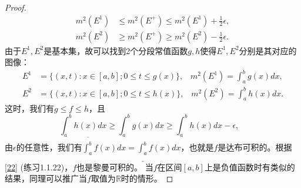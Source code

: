 \documentclass[reqno,a4paper,14pt]{amsart}
\begin{document}
\begin{proof}
    \begin{equation*}
        \begin{split}
            m^2(E^1)&\leq m^2(E^+)\leq m^2(E^1)+\frac{1}{2}\epsilon,\\
            m^2(E^2)&\geq m^2(E^+)\geq m^2(E^2)-\frac{1}{2}\epsilon.
        \end{split}
    \end{equation*}
    由于$E^1,E^2$是基本集，故可以找到2个分段常值函数$g,h$使得$E^1,E^2$分别是其对应的图像：
    \begin{equation*}
        \begin{split}
            E^1&=\{(x,t):x\in[a,b];0\leq t\leq g(x)\},\;\;\; m^2(E^1)=\int_a^b g(x)dx,\\
            E^2&=\{(x,t):x\in[a,b];0\leq t\leq h(x)\},\;\;\; m^2(E^2)=\int_a^b h(x)dx.
        \end{split}
    \end{equation*}
    这时，我们有$g\leq f\leq h$，且
    \begin{equation*}
        \int_a^b h(x)dx\geq \int_a^b g(x)dx \geq \int_a^b h(x)dx-\epsilon,\;\;\;
    \end{equation*}
    由$\epsilon$的任意性，我们有$\overline{\int_a^b} f(x)dx= \underline{\int_a^b} f(x)dx$，也就是$f$是达布可积的。根据\ref{22} (练习1.1.22)，$f$也是黎曼可积的。
    当$f$在区间$[a,b]$上是负值函数时有类似的结果，同理可以推广当$f$取值为$\mathbb{R}$时的情形。
\end{proof}
\end{document}
